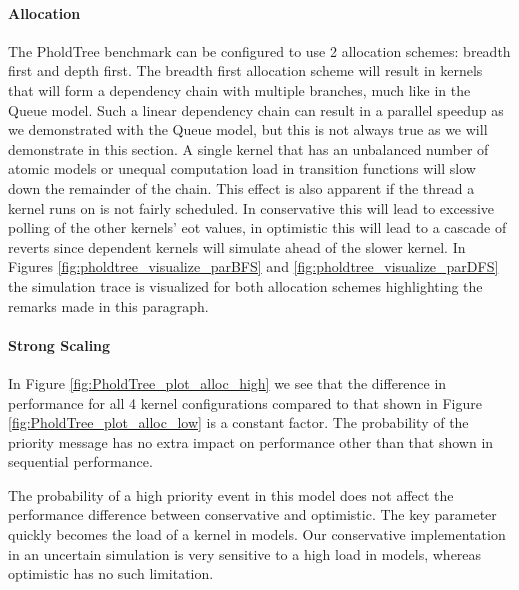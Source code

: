\paragraph*{Allocation}\label{PholdTreeallocation}
The PholdTree benchmark can be configured to use 2 allocation schemes: breadth first and depth first. 
The breadth first allocation scheme will result in kernels that will form a dependency chain with multiple branches, much like in the Queue model. 
Such a linear dependency chain can result in a parallel speedup as we demonstrated with the Queue model, but this is not always true as we will demonstrate in this section. 
A single kernel that has an unbalanced number of atomic models or unequal computation load in transition functions will slow down the remainder of the chain. This effect is also apparent if the thread a kernel runs on is not fairly scheduled. In conservative this will lead to excessive polling of the other kernels' eot values, in optimistic this will lead to a cascade of reverts since dependent kernels will simulate ahead of the slower kernel. In Figures \ref{fig:pholdtree_visualize_parBFS} and \ref{fig:pholdtree_visualize_parDFS} the simulation trace is visualized for both allocation schemes highlighting the remarks made in this paragraph.
%
%	
%	

\paragraph*{Strong Scaling}\label{pholdtreestrongscale}
In Figure \ref{fig:PholdTree_plot_alloc_high} we see that the difference in performance for all 4 kernel configurations compared to that shown in Figure \ref{fig:PholdTree_plot_alloc_low} is a constant factor. The probability of the priority message has no extra impact on performance other than that shown in sequential performance. 

The probability of a high priority event in this model does not affect the performance difference between conservative and optimistic. The key parameter quickly becomes the load of a kernel in models. Our conservative implementation in an uncertain simulation is very sensitive to a high load in models, whereas optimistic has no such limitation.

